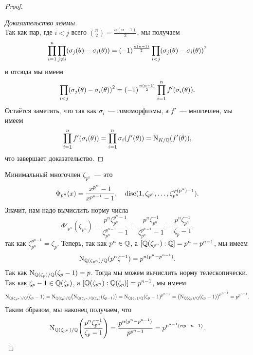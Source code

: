\begin{proof}
\begin{proof}[Доказательство леммы]
\[				\]
				Так как пар, где $i < j$ всего $\binom{n}{2} = \frac{n(n - 1)}{2}$, мы получаем 
				\[
					\prod_{i = 1}^{n}\prod_{j \neq i} (\sigma_j(\theta) - \sigma_i(\theta)) = (-1)^{\frac{n(n - 1)}{2}} \prod_{i < j}\lr*{\sigma_j(\theta) - \sigma_i(\theta)}^2
				\]
				и отсюда мы имеем 
				\[
					\prod_{i < j}\lr*{\sigma_j(\theta) - \sigma_i(\theta)}^2 = (-1)^{\frac{n(n - 1)}{2}}  \prod_{i = 1}^{n} f'(\sigma_i(\theta)).
				\]
				Остаётся заметить, что так как $\sigma_i$~--- гомоморфизмы, а $f'$~--- многочлен, мы имеем 
				\[
					\prod_{i = 1}^{n} f'(\sigma_i(\theta)) = \prod_{i = 1}^{n} \sigma_i(f'(\theta)) = \operatorname{\mathrm{N}}_{K/\mathbb{Q}}(f'(\theta)),
				\]
				что завершает доказательство. 

			\end{proof}

			Минимальный многочлен $\zeta_{p^n}$~--- это
			\[
				\Phi_{p^n}(x) = \frac{x^{p^n} - 1}{x^{p^{n - 1}} - 1}, \quad \operatorname{disc}(1, \zeta_{p^n}, \ldots, \zeta_{p^n}^{\varphi(p^n) - 1}).
			\]
			Значит, нам надо вычислить норму числа 
			\[
				\Phi'_{p^n}(\zeta_{p^n}) = \frac{p^n \zeta_{p^n}^{p^n - 1}}{\zeta_{p^n}^{p^{n - 1}} - 1} = \frac{p^n \zeta_{p^n}^{-1}}{\zeta_{p^n}^{p^{n - 1}} - 1} = \frac{p^n \zeta_{p^n}^{-1}}{\zeta_{p} - 1}.
			\]
			так как $\zeta_{p^n}^{p^{n - 1}} = \zeta_{p}$. Теперь, так как $p^n \in \mathbb{Q}$, а $[\mathbb{Q}(\zeta_{p^n}) : \mathbb{Q}] = p^n - p^{n - 1}$, мы имеем
			\[
				\operatorname{\mathrm{N}}_{\mathbb{Q}(\zeta_{p^n})/\mathbb{Q}}(p^n\zeta^{-1}) = p^{n (p^n - p^{n - 1})}.
			\]
			Так как $\operatorname{\mathrm{N}}_{\mathbb{Q}(\zeta_p)/\mathbb{Q}}(\zeta_p - 1) = p$. Тогда мы можем вычислить норму телескопически. Так как $\zeta_p - 1 \in \mathbb{Q}(\zeta_p)$, а $[\mathbb{Q}(\zeta_{p^n}) : \mathbb{Q}(\zeta_p)] = p^{n - 1}$, мы имеем
			\[
				\Nm_{\Q(\zeta_{p^n})/\Q}(\zeta_{p} - 1) = \Nm_{\Q(\zeta_p)/\Q}\lr*{\Nm_{\Q(\zeta_{p^n}/\Q(\zeta_p)}(\zeta_{p - 1})} = \Nm_{\Q(\zeta_p)/\Q}(\zeta_{p} - 1)^{p^{n - 1} } = \lr*{\Nm_{\Q(\zeta_p)/\Q}(\zeta_{p} - 1)}^{p^{n - 1}}   = p^{p^{n - 1}}. 
			\]
			Таким образом, мы наконец получаем, что 
			\[
				\Nm_{\Q(\zeta_{p^n})/\Q}\lr*{\frac{p^n \zeta_{p^n}^{-1}}{\zeta_{p} - 1}} = \frac{p^{n (p^n - p^{n - 1})}}{p^{p^{n} - 1}} = p^{p^{n - 1}(np - n - 1)}.
			\]
			
		\end{proof}	

